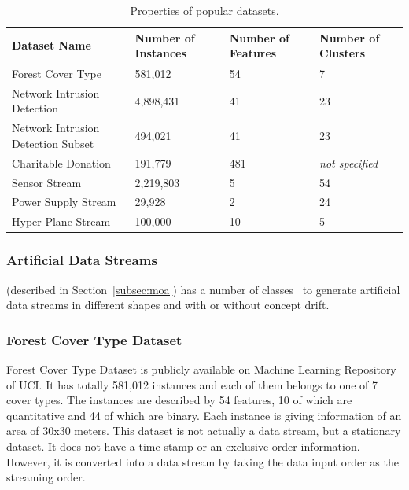 \documentclass[smallcondensed]{svjour3}     %
\begin{document}
\begin{table}[t]
	\caption{Properties of popular datasets.}
	\centering
	\begin{tabular}{p{3cm} p{2cm} p{2cm} p{2cm}}
		\textbf{Dataset Name} & \textbf{Number of \newline Instances} & \textbf{Number of \newline Features} & \textbf{Number of \newline Clusters} \\
		\hline
		Forest Cover Type 			& 581,012 & 54 & 7 \\
		Network Intrusion \newline Detection & 4,898,431 & 41 & 23 \\
		Network Intrusion \newline Detection Subset & 494,021 & 41 & 23 \\
		Charitable Donation			& 191,779 & 481 & \textit{not specified} \\
		Sensor Stream 	            & 2,219,803 & 5 & 54 \\
		Power Supply Stream 		& 29,928 & 2 & 24 \\
		Hyper Plane Stream 			& 100,000 & 10 & 5 \\		
		\hline
	\end{tabular}
	\label{tbl:dataSets}
\end{table}

\subsubsection{Artificial Data Streams}
\label{subsubsec:artificalStreams}
\citeauthor{Moa} (described in Section~\ref{subsec:moa}) has a number of classes~\citep{Moa:stream:generators} to generate artificial data streams in different shapes and with or without concept drift. 

\subsubsection{Forest Cover Type Dataset}
Forest Cover Type Dataset is publicly available on Machine Learning Repository of UCI. It has totally 581,012 instances and each of them belongs to one of 7 cover types. The instances are described by 54 features, 10 of which are quantitative and 44 of which are binary. Each instance is giving information of an area of 30x30 meters. This dataset is not actually a data stream, but a stationary dataset. It does not have a time stamp or an exclusive order information. However, it is converted into a data stream by taking the data input order as the streaming order.
\end{document}
